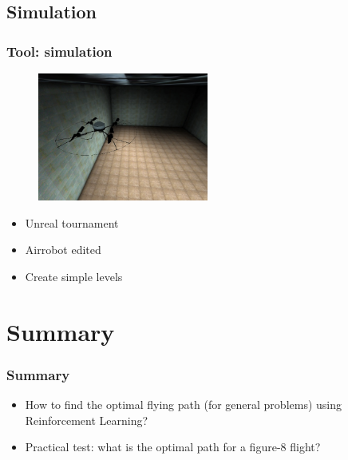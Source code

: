 \documentclass{beamer}
\begin{document}
\subsection{Simulation}

\begin{frame}
  \frametitle{Tool: simulation}
  \begin{figure}
    \includegraphics[width=0.5\textwidth]{img/AIRROBOT}
  \end{figure}
  \begin{itemize}
    \item Unreal tournament
    \item Airrobot edited
    \item Create simple levels
  \end{itemize}
\end{frame}

\section{Summary}

\begin{frame}
  \frametitle{Summary}
  \begin{itemize}
    \item How to find the optimal flying path (for general problems) using Reinforcement Learning?
    \item Practical test: what is the optimal path for a figure-8 flight?
  \end{itemize}
\end{frame}
\end{document}
